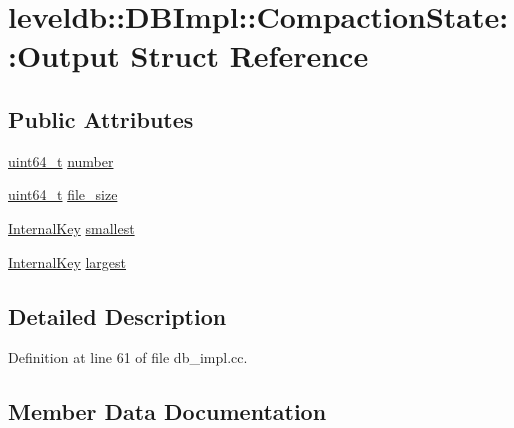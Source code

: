 \hypertarget{structleveldb_1_1_d_b_impl_1_1_compaction_state_1_1_output}{}\section{leveldb\+:\+:D\+B\+Impl\+:\+:Compaction\+State\+:\+:Output Struct Reference}
\label{structleveldb_1_1_d_b_impl_1_1_compaction_state_1_1_output}
\subsection*{Public Attributes}
\begin{DoxyCompactItemize}
\item 
\hyperlink{stdint_8h_aaa5d1cd013383c889537491c3cfd9aad}{uint64\+\_\+t} \hyperlink{structleveldb_1_1_d_b_impl_1_1_compaction_state_1_1_output_aa4b759dca2a83bdb8d9edbf7e2d213e2}{number}
\item 
\hyperlink{stdint_8h_aaa5d1cd013383c889537491c3cfd9aad}{uint64\+\_\+t} \hyperlink{structleveldb_1_1_d_b_impl_1_1_compaction_state_1_1_output_a37906cee65a9d1873b7b7a4169f22402}{file\+\_\+size}
\item 
\hyperlink{classleveldb_1_1_internal_key}{Internal\+Key} \hyperlink{structleveldb_1_1_d_b_impl_1_1_compaction_state_1_1_output_a88ada857d0cf32ae8e76d7baf4e80c69}{smallest}
\item 
\hyperlink{classleveldb_1_1_internal_key}{Internal\+Key} \hyperlink{structleveldb_1_1_d_b_impl_1_1_compaction_state_1_1_output_a6e257f231aba82d20cb7199a552b2a63}{largest}
\end{DoxyCompactItemize}


\subsection{Detailed Description}


Definition at line 61 of file db\+\_\+impl.\+cc.



\subsection{Member Data Documentation}
\hypertarget{structleveldb_1_1_d_b_impl_1_1_compaction_state_1_1_output_a37906cee65a9d1873b7b7a4169f22402}{}
